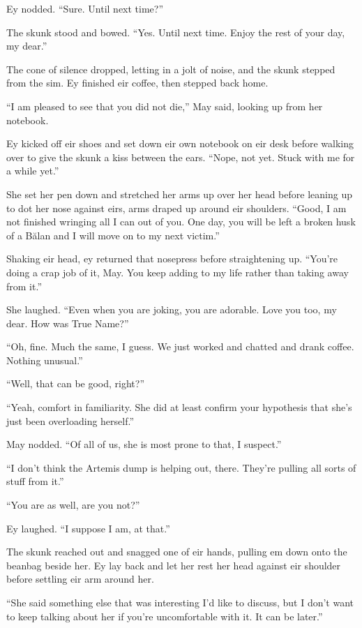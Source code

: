 Ey nodded. ``Sure. Until next time?''

The skunk stood and bowed. ``Yes. Until next time. Enjoy the rest of your day, my dear.''

The cone of silence dropped, letting in a jolt of noise, and the skunk stepped from the sim. Ey finished eir coffee, then stepped back home.

``I am pleased to see that you did not die,'' May said, looking up from her notebook.

Ey kicked off eir shoes and set down eir own notebook on eir desk before walking over to give the skunk a kiss between the ears. ``Nope, not yet. Stuck with me for a while yet.''

She set her pen down and stretched her arms up over her head before leaning up to dot her nose against eirs, arms draped up around eir shoulders. ``Good, I am not finished wringing all I can out of you. One day, you will be left a broken husk of a Bălan and I will move on to my next victim.''

Shaking eir head, ey returned that nosepress before straightening up. ``You're doing a crap job of it, May. You keep adding to my life rather than taking away from it.''

She laughed. ``Even when you are joking, you are adorable. Love you too, my dear. How was True Name?''

``Oh, fine. Much the same, I guess. We just worked and chatted and drank coffee. Nothing unusual.''

``Well, that can be good, right?''

``Yeah, comfort in familiarity. She did at least confirm your hypothesis that she's just been overloading herself.''

May nodded. ``Of all of us, she is most prone to that, I suspect.''

``I don't think the Artemis dump is helping out, there. They're pulling all sorts of stuff from it.''

``You are as well, are you not?''

Ey laughed. ``I suppose I am, at that.''

The skunk reached out and snagged one of eir hands, pulling em down onto the beanbag beside her. Ey lay back and let her rest her head against eir shoulder before settling eir arm around her.

``She said something else that was interesting I'd like to discuss, but I don't want to keep talking about her if you're uncomfortable with it. It can be later.''

